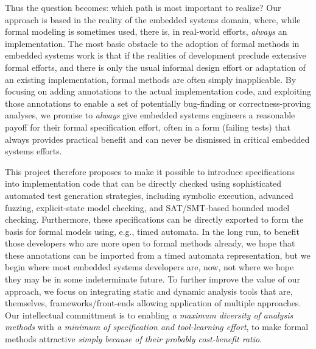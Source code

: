 Thus the question becomes:  which path is most important to realize?  Our approach is based in the reality of the embedded systems domain, where, while formal modeling is sometimes used, there is, in real-world efforts, \emph{always} an implementation.  The most basic obstacle to the adoption of formal methods in embedded systems work is that if the realities of development preclude extensive formal efforts, and there is only the usual informal design effort or adaptation of an existing implementation, formal methods are often simply inapplicable.  By focusing on adding annotations to the actual implementation code, and exploiting those annotations to enable a set of potentially bug-finding or correctness-proving analyses, we promise to \emph{always} give embedded systems engineers a reasonable payoff for their formal specification effort, often in a form (failing tests) that always provides practical benefit and can never be dismissed in critical embedded systems efforts.

This project therefore proposes to make it possible to introduce specifications into implementation code that can be directly checked using sophisticated automated test generation strategies, including symbolic execution, advanced fuzzing, explicit-state model checking, and SAT/SMT-based bounded model checking.   Furthermore, these specifications can be directly exported to form the basis for formal models using, e.g., timed automata.  In the long run, to benefit those developers who are more open to formal methods already, we hope that these annotations can be imported from a timed automata representation, but we begin where most embedded systems developers are, now, not where we hope they may be in some indeterminate future.
To further improve the value of our approach, we focus on integrating static and dynamic analysis tools that are, themselves, frameworks/front-ends allowing application of multiple approaches.  Our intellectual committment is to enabling \emph{a maximum diversity of analysis methods} with \emph{a minimum of specification and tool-learning effort}, to make formal methods attractive \emph{simply because of their probably cost-benefit ratio}.

